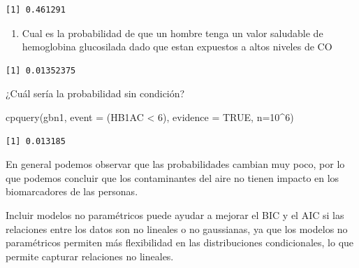 \documentclass[
  11pt,
  a4paper,
]{article}
\newenvironment{Shaded}{\begin{snugshade}}{\end{snugshade}}
\newcommand{\AttributeTok}[1]{\textcolor[rgb]{0.40,0.45,0.13}{#1}}
\newcommand{\ConstantTok}[1]{\textcolor[rgb]{0.56,0.35,0.01}{#1}}
\newcommand{\DecValTok}[1]{\textcolor[rgb]{0.68,0.00,0.00}{#1}}
\newcommand{\FloatTok}[1]{\textcolor[rgb]{0.68,0.00,0.00}{#1}}
\newcommand{\FunctionTok}[1]{\textcolor[rgb]{0.28,0.35,0.67}{#1}}
\newcommand{\NormalTok}[1]{\textcolor[rgb]{0.00,0.23,0.31}{#1}}
\newcommand{\SpecialCharTok}[1]{\textcolor[rgb]{0.37,0.37,0.37}{#1}}
\providecommand{\tightlist}{%
  \setlength{\itemsep}{0pt}\setlength{\parskip}{0pt}}\usepackage{longtable,booktabs,array}
\begin{document}
\begin{verbatim}
[1] 0.461291
\end{verbatim}

\begin{enumerate}
\def\labelenumi{\arabic{enumi}.}
\setcounter{enumi}{2}
\tightlist
\item
  Cual es la probabilidad de que un hombre tenga un valor saludable de
  hemoglobina glucosilada dado que estan expuestos a altos niveles de CO
\end{enumerate}

\begin{Shaded}
\end{Shaded}

\begin{verbatim}
[1] 0.01352375
\end{verbatim}

¿Cuál sería la probabilidad sin condición?

\begin{Shaded}
\begin{Highlighting}[numbers=left,,]
\FunctionTok{cpquery}\NormalTok{(gbn1, }\AttributeTok{event =}\NormalTok{ (HB1AC }\SpecialCharTok{\textless{}} \DecValTok{6}\NormalTok{), }\AttributeTok{evidence =} \ConstantTok{TRUE}\NormalTok{, }\AttributeTok{n=}\DecValTok{10}\SpecialCharTok{\^{}}\DecValTok{6}\NormalTok{)}
\end{Highlighting}
\end{Shaded}

\begin{verbatim}
[1] 0.013185
\end{verbatim}

En general podemos observar que las probabilidades cambian muy poco, por
lo que podemos concluir que los contaminantes del aire no tienen impacto
en los biomarcadores de las personas.

Incluir modelos no paramétricos puede ayudar a mejorar el BIC y el AIC
si las relaciones entre los datos son no lineales o no gaussianas, ya
que los modelos no paramétricos permiten más flexibilidad en las
distribuciones condicionales, lo que permite capturar relaciones no
lineales.
\end{document}
